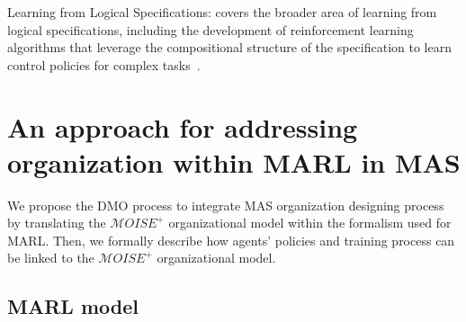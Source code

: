 \documentclass[runningheads]{llncs}
\begin{document}
Learning from Logical Specifications: covers the broader area of learning from logical specifications, including the development of reinforcement learning algorithms that leverage the compositional structure of the specification to learn control policies for complex tasks~\cite{Jothimurugan2021}.

\section{An approach for addressing organization within MARL in MAS}



We propose the DMO process to integrate MAS organization designing process by translating the $\mathcal{M}OISE^{+}$ organizational model within the formalism used for MARL. Then, we formally describe how agents' policies and training process can be linked to the $\mathcal{M}OISE^{+}$ organizational model.

\subsection{MARL model}
\end{document}
